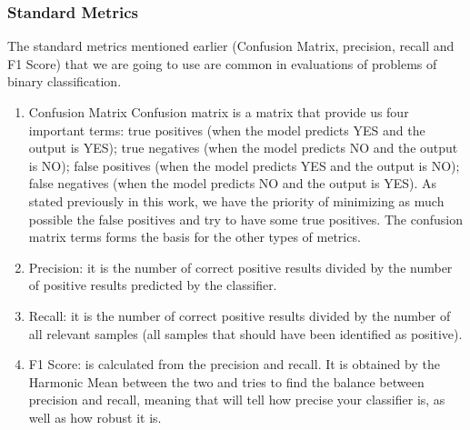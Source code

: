 \subsubsection{Standard Metrics}
The standard metrics mentioned earlier (Confusion Matrix, precision, recall and F1 Score) that we are going to use are common in evaluations of problems of binary classification.

\begin{enumerate}
    \item{Confusion Matrix}
Confusion matrix is a matrix that provide us four important terms: true positives (when the model predicts YES and the output is YES); true negatives (when the model predicts NO and the output is NO); false positives (when the model predicts YES and the output is NO); false negatives (when the model predicts NO and the output is YES).
As stated previously in this work, we have the priority of minimizing as much possible the false positives and try to have some true positives.
The confusion matrix terms forms the basis for the other types of metrics.

    \item{Precision:}
it is the number of correct positive results divided by the number of positive results predicted by the classifier.


    \item{Recall:}
it is the number of correct positive results divided by the number of all relevant samples (all samples that should have been identified as positive).


    \item{F1 Score:}
is calculated from the precision and recall. It is obtained by the Harmonic Mean between the two and tries to find the balance between precision and recall, meaning that will tell how precise your classifier is, as well as how robust it is.
    
    
\end{enumerate}

